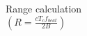 \documentclass[preview]{standalone}
\begin{document}
Range calculation \\ $\left( R = \frac{c T_{c} f_{beat}}{2 B} \right)$\\
\end{document}
